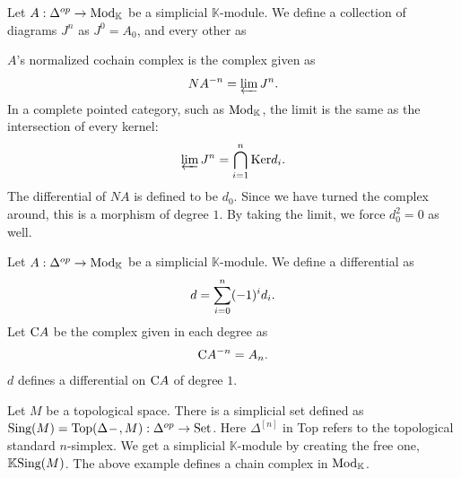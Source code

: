 \documentclass[../thesis.tex]{subfiles}
\begin{document}
            \begin{example}
                Let $A : \Delta^{op} \rightarrow \tt{Mod}_\mathbb{K}$ be a simplicial $\mathbb{K}$-module. We define a collection of diagrams $J^n$ as $J^0 = A_0$, and every other as
                \begin{center}
                \end{center}
                $A$'s normalized cochain complex is the complex given as
                \begin{align*}
                    NA^{-n} = \varprojlim J^n\tt{.}
                \end{align*}
                In a complete pointed category, such as $\tt{Mod}_\mathbb{K}$, the limit is the same as the intersection of every kernel:
                \begin{align*}
                    \varprojlim J^n = \bigcap_{i=1}^n\tt{Ker}d_i\tt{.}
                \end{align*}
                The differential of $NA$ is defined to be $d_0$. Since we have turned the complex around, this is a morphism of degree $1$. By taking the limit, we force $d_0^2 = 0$ as well.
            \end{example}
            \begin{example}\label{ex: ass-complex}
                Let $A : \Delta^{op} \rightarrow \tt{Mod}_\mathbb{K}$ be a simplicial $\mathbb{K}$-module. We define a differential as
                \begin{align*}
                    d = \sum_{i=0}^n(-1)^id_i\tt{.}
                \end{align*}
                Let $\tt{C}A$ be the complex given in each degree as
                \begin{align*}
                    \tt{C}A^{-n} = A_n\tt{.}
                \end{align*}
                $d$ defines a differential on $\tt{C}A$ of degree $1$.
            \end{example}
            \begin{example}
                Let $M$ be a topological space. There is a simplicial set defined as $\tt{Sing}(M) = \tt{Top}(\Delta^{\argument},M) : \Delta^{op} \rightarrow \tt{Set}$. Here $\Delta^{[n]}$ in Top refers to the topological standard $n$-simplex. We get a simplicial $\mathbb{K}$-module by creating the free one, $\mathbb{K}\tt{Sing}(M)$. The above example defines a chain complex in $\tt{Mod}_\mathbb{K}$.
            \end{example}
\end{document}
